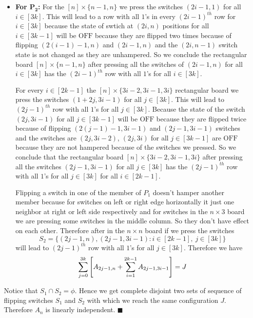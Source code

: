\documentclass[a4paper, 11pt]{article}
\renewenvironment{proof}{\noindent{\it \textbf{Proof:}}\hspace*{1em}}{\hfill $\blacksquare$\bigskip\\}
\begin{document}
{\begin{proof}
\begin{itemize}
		Flipping a switch in one of the member of $P_1$ doesn't hamper another member because for switches on left or right edge horizontally it just one neighbor at right or left side respectively and for switches in the $n\times 3$ board we are pressing some switches in the middle column. So they don't have effect on each other.  Therefore after in the $n\times n$ board if we press the switches $$S_1=\{(2j-1,1),(2j-1,3i+1)\colon i\in[2k-1],\ j\in[3k]\}$$ will lead to $(2j-1)^{th}$ row with all $1$'s for all $j\in[3k]$. Therefore we have $$\sum_{j=0}^{3k}\lt[A_{2j-1,1}+ \sum_{i=1}^{2k-1}A_{2j-1,3i+1}\rt]=J$$
		
		
		\item  \textbf{For $\boldsymbol{P_2}$:} For the $[n]\times \{n-1,n\}$ we press the switches $(2i-1,1)$ for all $i\in[3k]$. This will lead to a row with all $1$'s in every $(2i-1)^{th}$ row for $i\in[3k]$ because the state of swtich at $(2i,n)$ positions for all $i\in[3k-1]$ will be $\mathrm{OFF}$ because they are flipped two times because of flipping $(2(i-1)-1,n)$ and $(2i-1,n)$ and the $(2i,n-1)$ switch state is not changed as they are unhampered.    So we conclude the rectangular board $[n]\times \{n-1,n\}$ after pressing all the switches of  $(2i-1,n)$ for all $i\in[3k]$ has the  $(2i-1)^{th}$ row with all $1$'s for all $i\in[3k]$. \parinn
		
		For every $i\in[2k-1]$ the $[n]\times \{3i-2,3i-1,3i\}$ rectangular board we press the switches $(1+2j,3i-1)$ for all $j\in[3k]$. This will lead to $({2j-1})^{th}$ row with all $1$'s for all $j\in[3k]$. Because the state of the switch $(2j,3i-1)$ for all $j\in[3k-1]$ will be $\mathrm{OFF}$ because they are flipped twice because of flipping $(2(j-1)-1,3i-1)$ and $(2j-1,3i-1)$ switches and the switches are $(2j,3i-2)$, $(2j,3i)$ for all $j\in[3k-1]$ are $\mathrm{OFF}$ because they are not hampered because of the switches we pressed. So we conclude that the rectangular board $[n]\times \{3i-2,3i-1,3i\}$ after pressing all the switches  $(2j-1,3i-1)$ for all $j\in[3k]$ has  the $({2j-1})^{th}$ row with all $1$'s for all $j\in[3k]$ for all $i\in[2k-1]$.
		
		Flipping a switch in one of the member of $P_1$ doesn't hamper another member because for switches on left or right edge horizontally it just one neighbor at right or left side respectively and for switches in the $n\times 3$ board we are pressing some switches in the middle column. So they don't have effect on each other.  Therefore after in the $n\times n$ board if we press the switches $$S_2=\{(2j-1,n),(2j-1,3i-1)\colon i\in[2k-1],\ j\in[3k]\}$$ will lead to $(2j-1)^{th}$ row with all $1$'s for all $j\in[3k]$. Therefore we have $$\sum_{j=0}^{3k}\left[A_{2j-1,n}+ \sum_{i=1}^{2k-1}A_{2j-1,3i-1}\right]=J$$
	\end{itemize}
Notice that $S_1\cap S_2=\phi$. Hence we get complete disjoint two sets of sequence of flipping switches $S_1$ and $S_2$ with which we reach the same configuration $J$. Therefore $A_n$ is linearly independent.
\end{proof}

}
\end{document}

